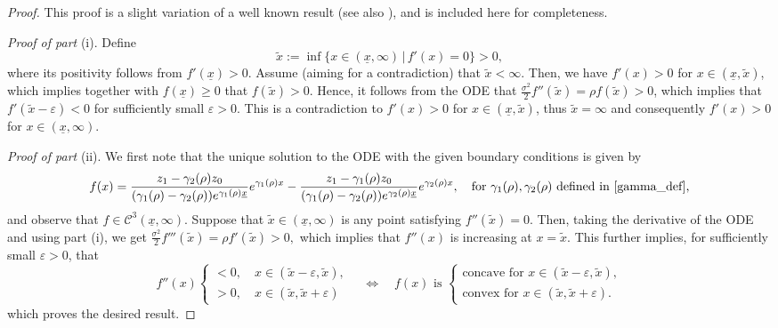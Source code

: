 \documentclass[11pt]{article} %
\newcommand{\ubar}[1]{\underaccent{\bar}{#1}}
\numberwithin{komcounter}{section}
\renewcommand{\epsilon}{\varepsilon}
\renewcommand{\ubar}{\underline}
\renewcommand{\bar}{\overline}
\numberwithin{equation}{section}
\numberwithin{theorem}{section}
\begin{document}
\begin{proof}
This proof is a slight variation of a well known result \cite[Lemma 4.1.]{shreve1984optimal} (see also \cite[Lemma 2.4]{erikfinetti2023}), and is included here for completeness. 

\vspace{1mm}
{\it Proof of part} (i). 
Define  
$$
\tilde{x} := \inf \{ x \in (\ubar{x},\infty) \,|\, f'(x)=0\} > 0,
$$
where its positivity follows from $f'(\ubar x)>0$. 
Assume (aiming for a contradiction) that $\tilde{x} < \infty$. 
Then, we have $f'(x)>0$ for $x\in (\ubar x,\tilde x)$, which implies together with $f(\ubar{x})\geq 0$ that $f(\tilde x) > 0$. 
Hence, it follows from the ODE that
$\tfrac{\sigma^2}{2}f''(\tilde x)=\rho f(\tilde x)>0$, 
which implies that $f'(\tilde x-\epsilon)<0$ for sufficiently small $\epsilon > 0$. 
This is a contradiction to $f'(x)>0$ for $x\in (\ubar x,\tilde x)$, thus $\tilde{x}=\infty$ and consequently  $f'(x)>0$ for $x\in (\ubar x,\infty)$. 

\vspace{1mm}
{\it Proof of part} (ii). 
We first note that the unique solution to the ODE with the given boundary conditions is given by
\begin{align*}
f(x)=\frac{z_1-\gamma_2(\rho)z_0}{(\gamma_1(\rho)-\gamma_2(\rho))e^{\gamma_1(\rho)\ubar{x}}}e^{\gamma_1(\rho)x}-\frac{z_1-\gamma_1(\rho)z_0}{(\gamma_1(\rho)-\gamma_2(\rho))e^{\gamma_2(\rho)\ubar{x}}}e^{\gamma_2(\rho)x},
\quad \text{for $\gamma_1(\rho), \gamma_2(\rho)$ defined in \eqref{gamma_def},}
\end{align*}
and observe that $f\in\mathcal{C}^3(\ubar x,\infty)$. 
Suppose that $\tilde x \in (\ubar{x},\infty)$ is any point satisfying $f''(\tilde x)=0$. 
Then, taking the derivative of the ODE and using part (i), we get 
$
\tfrac{\sigma^2}{2}f'''(\tilde x) = \rho f'(\tilde x)>0 ,
$
which implies that $f''(x)$ is increasing at $x=\tilde x$. 
This further implies, for sufficiently small $\epsilon > 0$, that 
$$
f''(x) \begin{cases} 
<0 , \quad x \in (\tilde x-\epsilon, \tilde x), \\
>0 , \quad x \in (\tilde x, \tilde x+\epsilon) 
\end{cases}
\quad \Leftrightarrow \quad 
f(x) \text{ is } \begin{cases} 
\text{concave for } x \in (\tilde x-\epsilon, \tilde x), \\
\text{convex for }  x \in (\tilde x, \tilde x+\epsilon). 
\end{cases}
$$
which proves the desired result.
\end{proof}

 

	
\end{document}
